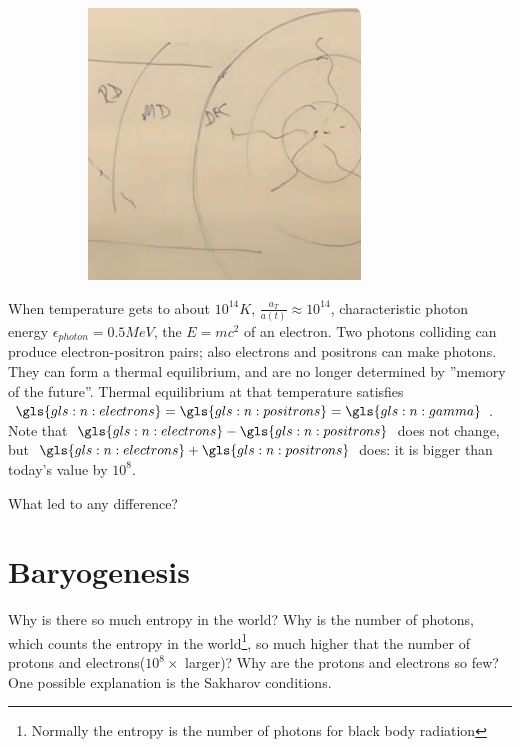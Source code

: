\documentclass[]{article}
\begin{document}
\begin{figure}[H]
\begin{subfigure}[t]{0.45\textwidth}
		\includegraphics[width=\textwidth]{cosmo-7-universe-2}
	\end{subfigure}
\end{figure}

When temperature gets to about $10^{14}K$, $\frac{a_T}{a(t)}\approx 10^{14}$, characteristic photon energy $\epsilon_{photon}=0.5MeV$,  the $E=mc^2$ of an electron. Two photons colliding can produce electron-positron pairs; also electrons and positrons can make photons. They can form a thermal equilibrium, and are no longer determined by ''memory of the future''. Thermal equilibrium at that temperature satisfies $\gls{gls:n:electrons}=\gls{gls:n:positrons}=\gls{gls:n:gamma}$. Note that  $\gls{gls:n:electrons}-\gls{gls:n:positrons}$ does not change, but $\gls{gls:n:electrons}+\gls{gls:n:positrons}$ does: it is bigger than today's value by $10^8$.

What led to any difference?



\section{Baryogenesis}

Why is there so much entropy in the world? Why is the number of photons, which counts the entropy in the world\footnote{Normally the entropy is the number of photons for black body radiation}, so much higher that the number of protons and electrons($10^8\times$ larger)? Why are the protons and electrons so few? One possible explanation is the Sakharov conditions.
\end{document}

